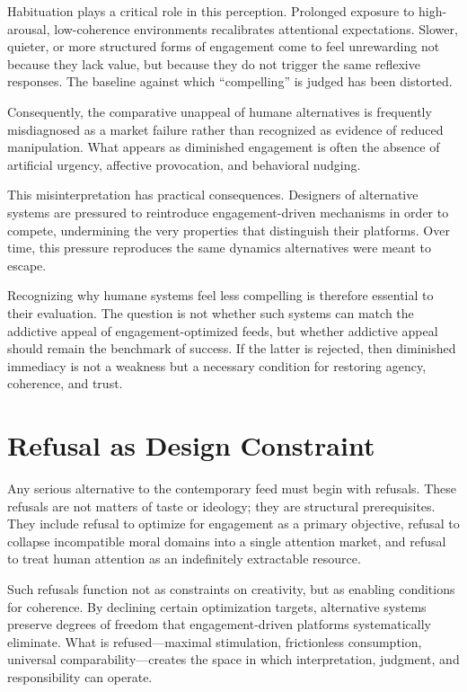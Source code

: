 \documentclass[12pt]{article}
\begin{document}
Habituation plays a critical role in this perception. Prolonged exposure to high-arousal, low-coherence environments recalibrates attentional expectations. Slower, quieter, or more structured forms of engagement come to feel unrewarding not because they lack value, but because they do not trigger the same reflexive responses. The baseline against which ``compelling'' is judged has been distorted.

Consequently, the comparative unappeal of humane alternatives is frequently misdiagnosed as a market failure rather than recognized as evidence of reduced manipulation. What appears as diminished engagement is often the absence of artificial urgency, affective provocation, and behavioral nudging.

This misinterpretation has practical consequences. Designers of alternative systems are pressured to reintroduce engagement-driven mechanisms in order to compete, undermining the very properties that distinguish their platforms. Over time, this pressure reproduces the same dynamics alternatives were meant to escape.

Recognizing why humane systems feel less compelling is therefore essential to their evaluation. The question is not whether such systems can match the addictive appeal of engagement-optimized feeds, but whether addictive appeal should remain the benchmark of success. If the latter is rejected, then diminished immediacy is not a weakness but a necessary condition for restoring agency, coherence, and trust.

\section{Refusal as Design Constraint}

Any serious alternative to the contemporary feed must begin with refusals. These refusals are not matters of taste or ideology; they are structural prerequisites. They include refusal to optimize for engagement as a primary objective, refusal to collapse incompatible moral domains into a single attention market, and refusal to treat human attention as an indefinitely extractable resource.

Such refusals function not as constraints on creativity, but as enabling conditions for coherence. By declining certain optimization targets, alternative systems preserve degrees of freedom that engagement-driven platforms systematically eliminate. What is refused—maximal stimulation, frictionless consumption, universal comparability—creates the space in which interpretation, judgment, and responsibility can operate.
\end{document}
